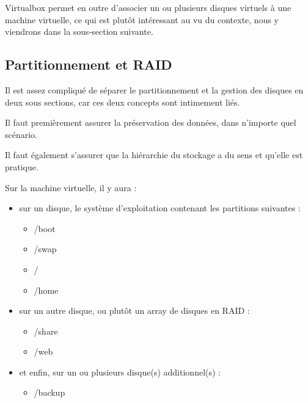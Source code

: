 \documentclass{article}
\begin{document}
Virtualbox permet en outre d'associer un ou plusieurs disques virtuels à une machine virtuelle, ce qui est plutôt intéressant au vu du contexte, nous y viendrons dans la sous-section suivante.	
	
\pagebreak
	\subsection{Partitionnement et RAID}

Il est assez compliqué de séparer le partitionnement et la gestion des disques en deux sous sections, car ces deux concepts sont intimement liés.

Il faut premièrement assurer la préservation des données, dans n'importe quel scénario. 

Il faut également s'assurer que la hiérarchie du stockage a du sens et qu'elle est pratique. 

Sur la machine virtuelle, il y aura :

\begin{itemize}
\item sur un disque, le système d'exploitation contenant les partitions suivantes :
\begin{itemize}
\item /boot
\item /swap
\item /
\item /home
\end{itemize}
\item sur un autre disque, ou plutôt un array de disques en RAID :
\begin{itemize}
\item /share
\item /web
\end{itemize}
\item et enfin, sur un ou plusieurs disque(s) additionnel(s) :
\begin{itemize}
\item /backup
\end{itemize}
\end{itemize}
	
\end{document}
